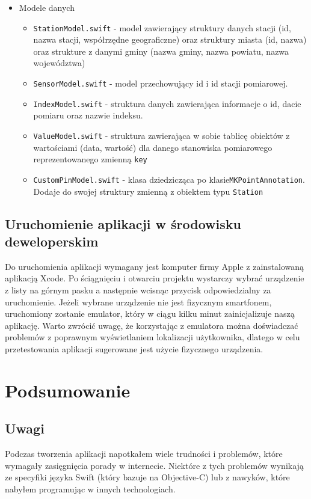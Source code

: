 \documentclass[a4paper,11pt,titlepage]{article}
\begin{document}
\begin{itemize}
	\item Modele danych
	\begin{itemize}
		\item \verb|StationModel.swift| - model zawierający struktury danych stacji (id, nazwa stacji, współrzędne geograficzne) oraz struktury miasta (id, nazwa) oraz strukture z danymi gminy (nazwa gminy, nazwa powiatu, nazwa województwa)
		\item \verb|SensorModel.swift| - model przechowujący id i id stacji pomiarowej.
		\item \verb|IndexModel.swift| - struktura danych zawierająca informacje o id, dacie pomiaru oraz nazwie indeksu.
		\item \verb|ValueModel.swift| - struktura zawierająca w sobie tablicę obiektów z wartościami (data, wartość) dla danego stanowiska pomiarowego reprezentowanego zmienną \verb|key|
		\item \verb|CustomPinModel.swift| - klasa dziedzicząca po klasie\newline \verb|MKPointAnnotation|. Dodaje do swojej struktury zmienną z obiektem typu \verb|Station|
	\end{itemize}
\end{itemize}


\subsection{Uruchomienie aplikacji w środowisku deweloperskim}
Do uruchomienia aplikacji wymagany jest komputer firmy Apple z zainstalowaną aplikacją Xcode. Po ściągnięciu i otwarciu projektu wystarczy wybrać urządzenie z listy na górnym pasku a następnie wcisnąc przycisk odpowiedzialny za uruchomienie. Jeżeli wybrane urządzenie nie jest fizycznym smartfonem, uruchomiony zostanie emulator, który w ciągu kilku minut zainicjalizuje naszą aplikację. Warto zwrócić uwagę, że korzystając z emulatora można doświadczać problemów z poprawnym wyświetlaniem lokalizacji użytkownika, dlatego w celu przetestowania aplikacji sugerowane jest użycie fizycznego urządzenia.


\section{Podsumowanie}
\subsection{Uwagi}
Podczas tworzenia aplikacji napotkałem wiele trudności i problemów, które wymagały zasięgnięcia porady w internecie. Niektóre z tych problemów wynikają ze specyfiki języka Swift (który bazuje na Objective-C) lub z nawyków, które nabyłem programując w innych technologiach.
\end{document}
